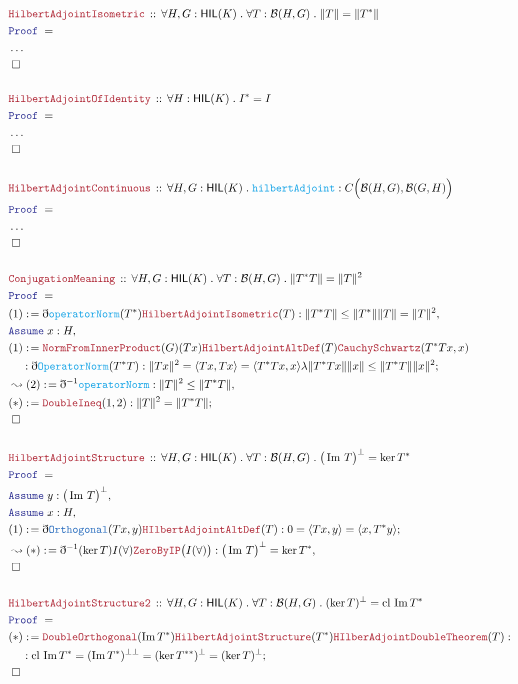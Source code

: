 \documentclass[12pt]{scrartcl}
\newcommand{\TYPE}[1]{\textcolor{NavyBlue}{\mathtt{#1}}}
\newcommand{\FUNC}[1]{\textcolor{Cerulean}{\mathtt{#1}}}
\newcommand{\LOGIC}[1]{\textcolor{Blue}{\mathtt{#1}}}
\newcommand{\THM}[1]{\textcolor{Maroon}{\mathtt{#1}}}
\renewcommand{\.}{\; . \;}
\newcommand{\de}{: \kern 0.1pc =}
\newcommand{\Theorem}[2]{& \THM{#1} \, :: \, #2 \\ & \Proof = \\ }
\newcommand{\NewLine}{\\ & \kern 1pc}
\newcommand{\Page}[1]{\begin{align*} #1 \end{align*} \newpage   }
\newcommand{ \bd }{ \ByDef }
\newcommand{\NoProof}{ & \ldots \\ \EndProof}
\DeclareMathOperator*{\im}{Im}
\newcommand{\Say}[3]{& #1 \de #2 : #3, \\}
\newcommand{\Conclude}[3]{& #1 \de #2 : #3; \\}
\newcommand{\Derive}[3]{& \leadsto #1 \de #2 : #3, \\}
\newcommand{\A}{\LOGIC{Assume} \;}
\newcommand{\Assume}[2]{& \A #1 : #2, \\}
\newcommand{\QED}{\; \square}
\newcommand{\EndProof}{& \QED \\}
\newcommand{\ByDef}{\eth}
\newcommand{\Proof}{\LOGIC{Proof} \; }
\newcommand{\HIL}{\mathsf{HIL}} %
\newcommand{\B}{\mathcal{B}}
\renewcommand{\l}{\lambda}
\begin{document}
\Page{
	\Theorem{HilbertAdjointIsometric}{\forall H,G : \HIL(K) \. \forall T : \B(H,G) \. \| T \| = \| T^* \|}
	\NoProof
	\\
	\Theorem{HilbertAdjointOfIdentity}{\forall H : \HIL(K) \.  I^* = I}
	\NoProof
	\\
	\Theorem{HilbertAdjointContinuous}{\forall H,G : \HIL(K) \. \FUNC{hilbertAdjoint} : C\Big( \B(H,G),\B(G,H)  \Big)}
	\NoProof
	\\
	\Theorem{ConjugationMeaning}{\forall H,G : \HIL(K) \. \forall T : \B(H,G) \. \| T^* T \| = \| T \|^2}
	\Say{(1)}{ \bd \FUNC{operatorNorm}(T^*)\THM{HilbertAdjointIsometric}(T)  }
	{ \| T^* T \| \le \| T^* \| \| T \| = \| T \|^2  }
	\Assume{x}{H}
	\Conclude{(1)}{ 
		\THM{NormFromInnerProduct}(G)(Tx)
		\THM{HilbertAdjointAltDef}(T)
		\THM{CauchySchwartz}(T^*Tx,x)
		\NewLine :
		\bd \FUNC{OperatorNorm}(T^*T)
		}
	{  \| Tx \|^2 = \langle Tx, Tx \rangle = \langle T^*Tx, x \rangle \l \| T^*Tx  \|\|x\| \le \| T^*T\|\|x\|^2  }
	\Derive{(2)}{\bd^{-1}\FUNC{operatorNorm} }{\| T \|^2 \le \| T^* T \| }
	\Conclude{(*)}{\THM{DoubleIneq}(1,2)}{ \| T \|^2 = \| T^* T \|  }
	\EndProof
	\\
	\Theorem{HilbertAdjointStructure}{\forall H,G : \HIL(K) \. \forall T : \B(H,G) \.  \big( \im \, T \big)^\bot = \ker T^*}
	\Assume{y}{\big( \im \, T  \big)^\bot}
	\Assume{x}{H}
	\Conclude{(1)}{\bd \TYPE{Orthogonal}(Tx,y) \THM{HIlbertAdjointAltDef}(T)}{0 = \langle Tx, y \rangle = \langle x, T^* y \rangle}
	\Derive{(*)}{ \bd^{-1}(\ker T)I(\forall)\THM{ZeroByIP}\big(I(\forall)\big)}{ \big( \im \, T \big)^\bot = \ker T^*}
	\EndProof
	\\
	\Theorem{HilbertAdjointStructure2}{\forall H,G : \HIL(K) \. \forall T : \B(H,G) \. (\ker T)^\bot = \mathrm{cl}\, \im T^* }
	\Conclude{(*)}{ \THM{DoubleOrthogonal}(\im T^*)\THM{HilbertAdjointStructure}(T^*)\THM{HIlberAdjointDoubleTheorem}(T) }
	{ 
		\NewLine :
		\mathrm{cl}\, \im T^* = 
		(\im T^*)^{\bot\bot} = 
		(\ker T^{**})^\bot =  
		(\ker T)^\bot
	}
	\EndProof
}
\end{document}
